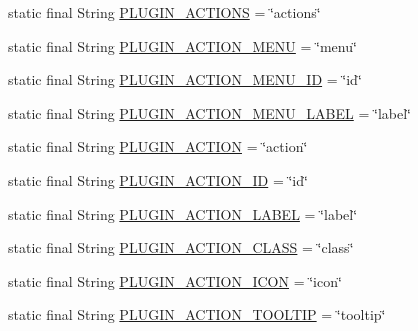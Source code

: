 \begin{DoxyCompactItemize}
\item 
static final String \hyperlink{interfaceorg_1_1tzi_1_1use_1_1runtime_1_1util_1_1_i_plugin_parser_symbols_a7283a58cfbadfe3c913b3914bc6df227}{P\-L\-U\-G\-I\-N\-\_\-\-A\-C\-T\-I\-O\-N\-S} = \char`\"{}actions\char`\"{}
\item 
static final String \hyperlink{interfaceorg_1_1tzi_1_1use_1_1runtime_1_1util_1_1_i_plugin_parser_symbols_aec0b807571490bddc38d18aa4e1ce01c}{P\-L\-U\-G\-I\-N\-\_\-\-A\-C\-T\-I\-O\-N\-\_\-\-M\-E\-N\-U} = \char`\"{}menu\char`\"{}
\item 
static final String \hyperlink{interfaceorg_1_1tzi_1_1use_1_1runtime_1_1util_1_1_i_plugin_parser_symbols_a522469c28c29dc537a33dd2c75a77f06}{P\-L\-U\-G\-I\-N\-\_\-\-A\-C\-T\-I\-O\-N\-\_\-\-M\-E\-N\-U\-\_\-\-I\-D} = \char`\"{}id\char`\"{}
\item 
static final String \hyperlink{interfaceorg_1_1tzi_1_1use_1_1runtime_1_1util_1_1_i_plugin_parser_symbols_a3b29240b2aa6e62601fd845558b52c4c}{P\-L\-U\-G\-I\-N\-\_\-\-A\-C\-T\-I\-O\-N\-\_\-\-M\-E\-N\-U\-\_\-\-L\-A\-B\-E\-L} = \char`\"{}label\char`\"{}
\item 
static final String \hyperlink{interfaceorg_1_1tzi_1_1use_1_1runtime_1_1util_1_1_i_plugin_parser_symbols_ae0dfdf1d25028ef4c5122c5eb806aca4}{P\-L\-U\-G\-I\-N\-\_\-\-A\-C\-T\-I\-O\-N} = \char`\"{}action\char`\"{}
\item 
static final String \hyperlink{interfaceorg_1_1tzi_1_1use_1_1runtime_1_1util_1_1_i_plugin_parser_symbols_a8c23a9b36bdb8ec1df79e4397ceaee3e}{P\-L\-U\-G\-I\-N\-\_\-\-A\-C\-T\-I\-O\-N\-\_\-\-I\-D} = \char`\"{}id\char`\"{}
\item 
static final String \hyperlink{interfaceorg_1_1tzi_1_1use_1_1runtime_1_1util_1_1_i_plugin_parser_symbols_a70eabdcc6cea74c1ae7c668ec7e801e0}{P\-L\-U\-G\-I\-N\-\_\-\-A\-C\-T\-I\-O\-N\-\_\-\-L\-A\-B\-E\-L} = \char`\"{}label\char`\"{}
\item 
static final String \hyperlink{interfaceorg_1_1tzi_1_1use_1_1runtime_1_1util_1_1_i_plugin_parser_symbols_a882577762dd5a38b5cf8a5ec6ac9a429}{P\-L\-U\-G\-I\-N\-\_\-\-A\-C\-T\-I\-O\-N\-\_\-\-C\-L\-A\-S\-S} = \char`\"{}class\char`\"{}
\item 
static final String \hyperlink{interfaceorg_1_1tzi_1_1use_1_1runtime_1_1util_1_1_i_plugin_parser_symbols_a8bb8376aed683b1fb15ec2ddda44767d}{P\-L\-U\-G\-I\-N\-\_\-\-A\-C\-T\-I\-O\-N\-\_\-\-I\-C\-O\-N} = \char`\"{}icon\char`\"{}
\item 
static final String \hyperlink{interfaceorg_1_1tzi_1_1use_1_1runtime_1_1util_1_1_i_plugin_parser_symbols_a209a3cfd9e8e124e129ae91d8f1d37c2}{P\-L\-U\-G\-I\-N\-\_\-\-A\-C\-T\-I\-O\-N\-\_\-\-T\-O\-O\-L\-T\-I\-P} = \char`\"{}tooltip\char`\"{}

\end{DoxyCompactItemize}
